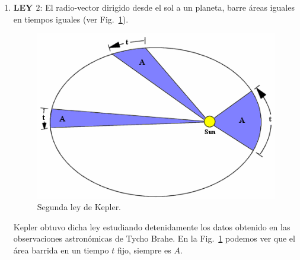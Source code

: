 \begin{enumerate}
\item \textbf{LEY $2$}: El radio-vector dirigido desde el sol a un planeta, barre áreas iguales en tiempos iguales (ver Fig.~\ref{fig:ley2}).
\begin{figure}[h]
\begin{center}
\includegraphics[scale=0.4]{gravitacion/g-ley2}
\end{center}
\caption{Segunda ley de Kepler.}
\label{fig:ley2}
\end{figure}

Kepler obtuvo dicha ley estudiando detenidamente los datos obtenido en las observaciones astronómicas de Tycho Brahe. En la Fig.~\ref{fig:ley2} podemos ver que el área barrida en un tiempo $t$ fijo, siempre es $A$. 


\end{enumerate}
